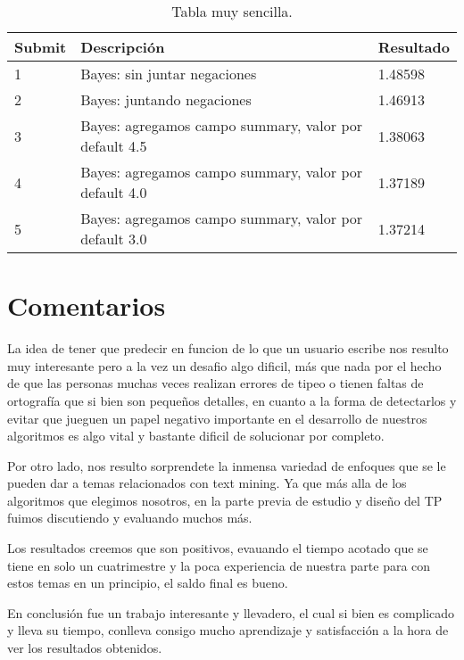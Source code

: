 \documentclass[a4paper,11pt]{report}
\begin{document}
\begin{table}[htbp]
\begin{center}
\begin{tabular}{|l|l|l|}
\hline
Submit & Descripción & Resultado \\
\hline \hline \hline
1 & Bayes: sin juntar negaciones & 1.48598 \\ \hline
2 & Bayes: juntando negaciones & 1.46913  \\ \hline
3 & Bayes: agregamos campo summary, valor por default 4.5 & 1.38063 \\ \hline
4 & Bayes: agregamos campo summary, valor por default 4.0 & 1.37189 \\ \hline
5 & Bayes: agregamos campo summary, valor por default 3.0 & 1.37214 \\ \hline
\end{tabular}
\caption{Tabla muy sencilla.}
\label{tabla:sencilla}
\end{center}
\end{table}

\chapter{Comentarios}

La idea de tener que predecir en funcion de lo que un usuario escribe nos resulto muy interesante pero a la vez un desafio algo dificil, más que nada por el hecho de que las personas muchas veces realizan errores de tipeo o tienen faltas de ortografía que si bien son pequeños detalles, en cuanto a la forma de detectarlos y evitar que jueguen un papel negativo importante en el desarrollo de nuestros algoritmos es algo vital y bastante dificil de solucionar por completo. 

Por otro lado, nos resulto sorprendete la inmensa variedad de enfoques que se le pueden dar a temas relacionados con text mining. Ya que más alla de los algoritmos que elegimos nosotros, en la parte previa de estudio y diseño del TP fuimos discutiendo y evaluando muchos más.

Los resultados creemos que son positivos, evauando el tiempo acotado que se tiene en solo un cuatrimestre y la poca experiencia de nuestra parte para con estos temas en un principio, el saldo final es bueno.

En conclusión fue un trabajo interesante y llevadero, el cual si bien es complicado y lleva su tiempo, conlleva consigo mucho aprendizaje y satisfacción a la hora de ver los resultados obtenidos.  
\end{document}
